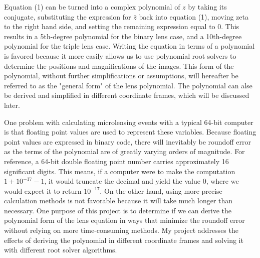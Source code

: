 \documentclass{article}
\begin{document}
Equation (1) can be turned into a complex polynomial of $z$ by
taking its conjugate, substituting the expression for $\bar{z}$ back into
equation (1), moving zeta to the right hand side, and setting the remaining
expression equal to $0$. This results in a 5th-degree  polynomial for the
binary lens case, and a 10th-degree polynomial for the triple lens case.
Writing the equation in terms of a polynomial is favored because it more
easily allows us to use polynomial root solvers to determine the positions
and magnifications of the images. This form of the polynomial, without
further simplifications or assumptions, will hereafter be referred to as
the "general form" of the lens polynomial. The polynomial can alse be derived
and simplified in different coordinate frames, which will be discussed later.

One problem with calculating microlensing events with a typical 64-bit computer
is that floating point values are used to represent these variables. Because
floating point values are expressed in binary code, there will inevitably be
roundoff error as the terms of the polynomial are of greatly varying orders
of magnitude. For reference, a 64-bit double floating point number carries
approximately 16 significant digits. This means, if a computer were to make
the computation $1 + 10^{-17} - 1$, it would truncate the decimal and yield
the value $0$, where we would expect it to return $10^{-17}$. On the other
hand, using more precise calculation methods is not favorable because it will
take much longer than necessary. One purpose of this project is to determine
if we can derive the polynomial form of the lens equation in ways that minimize
the roundoff error without relying on more time-consuming methods. My project
addresses the effects of deriving the polynomial in different coordinate frames
and solving it with different root solver algorithms.
\end{document}
